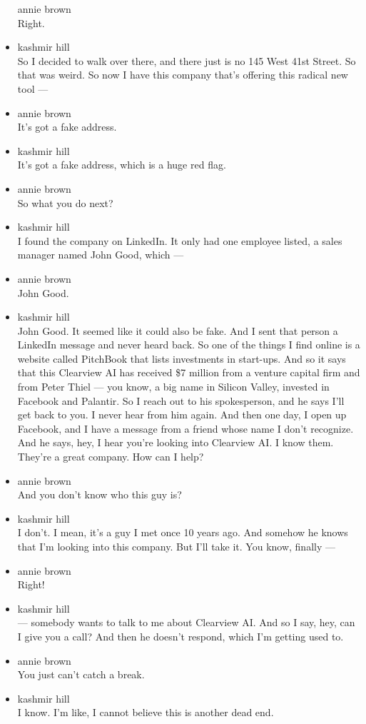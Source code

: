 \begin{itemize}
  annie brown\\
  Right.
\item
  kashmir hill\\
  So I decided to walk over there, and there just is no 145 West 41st
  Street. So that was weird. So now I have this company that's offering
  this radical new tool ---
\item
  annie brown\\
  It's got a fake address.
\item
  kashmir hill\\
  It's got a fake address, which is a huge red flag.
\item
  annie brown\\
  So what you do next?
\item
  kashmir hill\\
  I found the company on LinkedIn. It only had one employee listed, a
  sales manager named John Good, which ---
\item
  annie brown\\
  John Good.
\item
  kashmir hill\\
  John Good. It seemed like it could also be fake. And I sent that
  person a LinkedIn message and never heard back. So one of the things I
  find online is a website called PitchBook that lists investments in
  start-ups. And so it says that this Clearview AI has received \$7
  million from a venture capital firm and from Peter Thiel --- you know,
  a big name in Silicon Valley, invested in Facebook and Palantir. So I
  reach out to his spokesperson, and he says I'll get back to you. I
  never hear from him again. And then one day, I open up Facebook, and I
  have a message from a friend whose name I don't recognize. And he
  says, hey, I hear you're looking into Clearview AI. I know them.
  They're a great company. How can I help?
\item
  annie brown\\
  And you don't know who this guy is?
\item
  kashmir hill\\
  I don't. I mean, it's a guy I met once 10 years ago. And somehow he
  knows that I'm looking into this company. But I'll take it. You know,
  finally ---
\item
  annie brown\\
  Right!
\item
  kashmir hill\\
  --- somebody wants to talk to me about Clearview AI. And so I say,
  hey, can I give you a call? And then he doesn't respond, which I'm
  getting used to.
\item
  annie brown\\
  You just can't catch a break.
\item
  kashmir hill\\
  I know. I'm like, I cannot believe this is another dead end.


\end{itemize}
